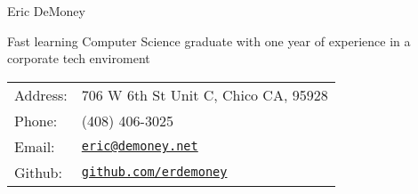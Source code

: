 \documentclass[letterpaper]{article}
\def\name{Eric DeMoney}
\begin{document}
{\huge \name}



\begin{minipage}{0.475\linewidth}
    Fast learning Computer Science graduate with one year of experience in a corporate tech enviroment
\end{minipage}
\hspace{0.125cm}
\begin{minipage}{0.475\linewidth}
  \begin{tabular}{ll}
    Address: & 706 W 6th St Unit C, Chico CA, 95928\\
    Phone: & (408) 406-3025 \\
    Email: & \href{mailto:eric@demoney.net}{\tt eric@demoney.net} \\
    Github: & \href{https://github.com/erdemoney}{\tt github.com/erdemoney} \\
  \end{tabular}
\end{minipage}

\vspace{0.2in}
\end{document}
